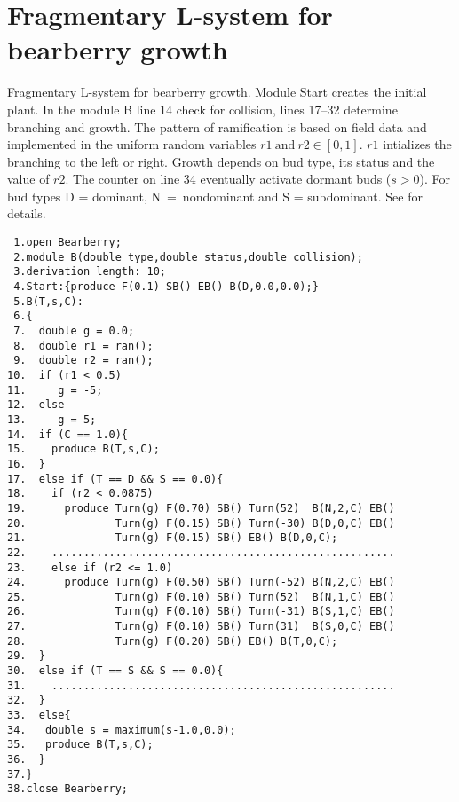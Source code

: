 \section{Fragmentary  L-system for bearberry growth}\label{sec:L2}
Fragmentary L-system  for bearberry  growth. Module Start  creates the
initial  plant. In the  module B  line 14  check for  collision, lines
17--32 determine branching and  growth. The pattern of ramification is
based on  field data and  implemented in the uniform  random variables
$r1~\mathrm{and}~r2 \in [0,1]$.  $r1$  intializes the branching to the
left or right.   Growth depends on bud type, its  status and the value
of $r2$.  The counter on  line 34 eventually activate dormant buds ($s
> 0$).  For  bud types D  = dominant, \mbox{N  = nondominant} and  S =
subdominant.  See \citet{salemaa:02} for details.

\begin{verbatim}
 1.open Bearberry;
 2.module B(double type,double status,double collision); 
 3.derivation length: 10;
 4.Start:{produce F(0.1) SB() EB() B(D,0.0,0.0);}
 5.B(T,s,C):
 6.{
 7.  double g = 0.0;
 8.  double r1 = ran();
 9.  double r2 = ran();
10.  if (r1 < 0.5) 
11.     g = -5;
12.  else 
13.     g = 5;
14.  if (C == 1.0){
15.    produce B(T,s,C);
16.  }
17.  else if (T == D && S == 0.0){
18.    if (r2 < 0.0875)
19.      produce Turn(g) F(0.70) SB() Turn(52)  B(N,2,C) EB() 
20.              Turn(g) F(0.15) SB() Turn(-30) B(D,0,C) EB()
21.              Turn(g) F(0.15) SB() EB() B(D,0,C);
22.    ......................................................
23.    else if (r2 <= 1.0)
24.      produce Turn(g) F(0.50) SB() Turn(-52) B(N,2,C) EB() 
25.              Turn(g) F(0.10) SB() Turn(52)  B(N,1,C) EB()
26.              Turn(g) F(0.10) SB() Turn(-31) B(S,1,C) EB()
27.              Turn(g) F(0.10) SB() Turn(31)  B(S,0,C) EB()
28.              Turn(g) F(0.20) SB() EB() B(T,0,C);
29.  } 
30.  else if (T == S && S == 0.0){
31.    ......................................................
32.  }
33.  else{
34.   double s = maximum(s-1.0,0.0);
35.   produce B(T,s,C);
36.  }
37.}
38.close Bearberry;
\end{verbatim}

